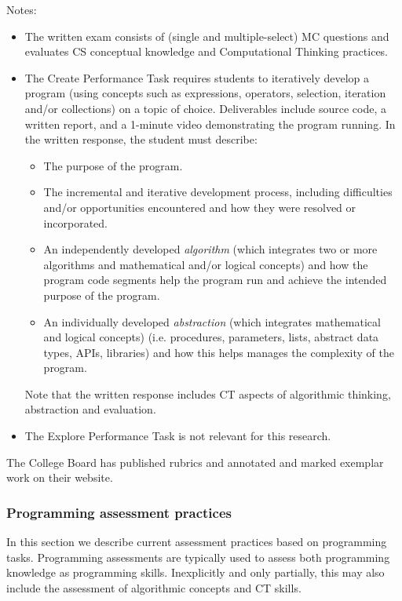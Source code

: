Notes:
\begin{itemize}
\item The written exam consists of (single and multiple-select) MC questions and evaluates CS conceptual knowledge and Computational Thinking practices.
\item The Create Performance Task requires students to iteratively develop a program (using concepts such as expressions, operators, selection, iteration and/or collections) on a topic of choice. Deliverables include source code, a written report, and a 1-minute video demonstrating the program running. In the written response, the student must describe:
     \begin{itemize}
     \item The purpose of the program.
     \item The incremental and iterative development process, including difficulties and/or opportunities encountered and how they were resolved or incorporated.
     \item An independently developed \emph{algorithm} (which integrates two or more algorithms and mathematical and/or logical concepts) and how the program code segments help the program run and achieve the intended purpose of the program.
     \item An individually developed \emph{abstraction} (which integrates mathematical and logical concepts) (i.e. procedures, parameters, lists, abstract data types, APIs, libraries) and how this helps manages the complexity of the program.
     \end{itemize}
     Note that the written response includes CT aspects of algorithmic thinking, abstraction and evaluation.
\item The Explore Performance Task is not relevant for this research.
\end{itemize}
The College Board has published rubrics and annotated and marked exemplar work on their website.

\subsubsection{Programming assessment practices}\label{sec:progAssessPractices}

In this section we describe current assessment practices based on programming tasks. Programming assessments are typically used to assess both programming knowledge as programming skills. Inexplicitly and only partially, this may also include the assessment of algorithmic concepts and CT skills.


